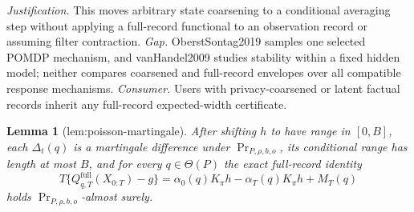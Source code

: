 \documentclass{article}
\newtheorem{lemma}{Lemma}
\begin{document}
\par\smallskip\noindent \textit{Justification.} This moves arbitrary state coarsening to a conditional averaging step without applying a full-record functional to an observation record or assuming filter contraction. \textit{Gap.} OberstSontag2019 samples one selected POMDP mechanism, and vanHandel2009 studies stability within a fixed hidden model; neither compares coarsened and full-record envelopes over all compatible response mechanisms. \textit{Consumer.} Users with privacy-coarsened or latent factual records inherit any full-record expected-width certificate.

\begin{lemma}[lem:poisson-martingale]\label{lem:poisson-martingale}
After shifting \(h\) to have range in \([0,B]\), each \(\Delta_t(q)\) is a martingale difference under \(\Pr_{P,\rho,b,o}\), its conditional range has length at most \(B\), and for every \(q\in\Theta(P)\) the exact full-record identity \[T\{Q^{\mathrm{full}}_{q,T}(X_{0:T})-g\}=\alpha_0(q)K_{\pi}h-\alpha_T(q)K_{\pi}h+M_T(q)\] holds \(\Pr_{P,\rho,b,o}\)-almost surely.
\end{lemma}
\end{document}
